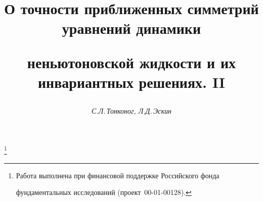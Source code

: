 

  


%


  


\newcommand{\tts}[1]{}  


  




  


\setcounter{page}{54}  












  


\author{\it С.Л.\,Тонконог, Л.Д.\,Эскин}  




\title{О точности приближенных симметрий уравнений динамики  


неньютоновской жидкости и их инвариантных решениях. II}  


\thanks{Работа выполнена при финансовой поддержке Российского фонда  


фундаментальных исследований (проект \No\,00-01-00128).}  


  


\date{}  




\pagestyle{plain} %


  




